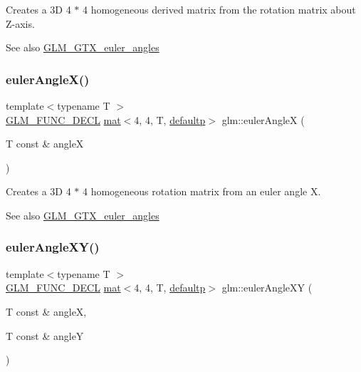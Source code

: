 Creates a 3D 4 $\ast$ 4 homogeneous derived matrix from the rotation matrix about Z-\/axis. \begin{DoxySeeAlso}{See also}
\hyperlink{group__gtx__euler__angles}{G\+L\+M\+\_\+\+G\+T\+X\+\_\+euler\+\_\+angles} 
\end{DoxySeeAlso}
\mbox{\label{group__gtx__euler__angles_gafba6282e4ed3ff8b5c75331abfba3489}} 
\subsubsection{\texorpdfstring{euler\+Angle\+X()}{eulerAngleX()}}
{\footnotesize\ttfamily template$<$typename T $>$ \\
\hyperlink{setup_8hpp_ab2d052de21a70539923e9bcbf6e83a51}{G\+L\+M\+\_\+\+F\+U\+N\+C\+\_\+\+D\+E\+CL} \hyperlink{structglm_1_1mat}{mat}$<$4, 4, T, \hyperlink{namespaceglm_a36ed105b07c7746804d7fdc7cc90ff25a9d21ccd8b5a009ec7eb7677befc3bf51}{defaultp}$>$ glm\+::euler\+AngleX (\begin{DoxyParamCaption}\item[{T const \&}]{angleX }\end{DoxyParamCaption})}

Creates a 3D 4 $\ast$ 4 homogeneous rotation matrix from an euler angle X. \begin{DoxySeeAlso}{See also}
\hyperlink{group__gtx__euler__angles}{G\+L\+M\+\_\+\+G\+T\+X\+\_\+euler\+\_\+angles} 
\end{DoxySeeAlso}
\mbox{\label{group__gtx__euler__angles_ga64036577ee17a2d24be0dbc05881d4e2}} 
\subsubsection{\texorpdfstring{euler\+Angle\+X\+Y()}{eulerAngleXY()}}
{\footnotesize\ttfamily template$<$typename T $>$ \\
\hyperlink{setup_8hpp_ab2d052de21a70539923e9bcbf6e83a51}{G\+L\+M\+\_\+\+F\+U\+N\+C\+\_\+\+D\+E\+CL} \hyperlink{structglm_1_1mat}{mat}$<$4, 4, T, \hyperlink{namespaceglm_a36ed105b07c7746804d7fdc7cc90ff25a9d21ccd8b5a009ec7eb7677befc3bf51}{defaultp}$>$ glm\+::euler\+Angle\+XY (\begin{DoxyParamCaption}\item[{T const \&}]{angleX,  }\item[{T const \&}]{angleY }\end{DoxyParamCaption})}


